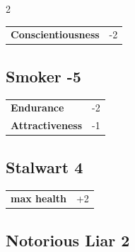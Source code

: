 \begin{multicols}{2}
\begin{tcolorbox}
\begin{tabular}{@{}ll@{}}
    \textbf{Conscientiousness} & -2\\
\end{tabular}


\end{tcolorbox}

\begin{tcolorbox}
    \subsection*{Smoker \hfill \small{-5 }}
    \tcblower




\begin{tabular}{@{}ll@{}}
    \textbf{Endurance} & -2\\
    \textbf{Attractiveness} & -1\\
\end{tabular}


\end{tcolorbox}

\begin{tcolorbox}
    \subsection*{Stalwart \hfill \small{4 }}
    \tcblower




\begin{tabular}{@{}ll@{}}
    \textbf{max health} & +2\\
\end{tabular}


\end{tcolorbox}

\begin{tcolorbox}
    \subsection*{Notorious Liar \hfill \small{2 }}
    \tcblower





\end{tcolorbox}
\end{multicols}
